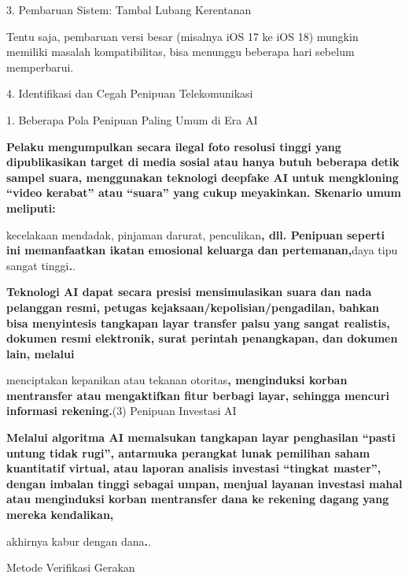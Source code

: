 3. Pembaruan Sistem: Tambal Lubang Kerentanan


Tentu saja, pembaruan versi besar (misalnya iOS 17 ke iOS 18) mungkin memiliki masalah kompatibilitas, bisa menunggu beberapa hari sebelum memperbarui.

4. Identifikasi dan Cegah Penipuan Telekomunikasi


1. Beberapa Pola Penipuan Paling Umum di Era AI


\textbf{Pelaku mengumpulkan secara ilegal foto resolusi tinggi yang dipublikasikan target di media sosial atau hanya butuh beberapa detik sampel suara, menggunakan teknologi deepfake AI untuk mengkloning “video kerabat” atau “suara” yang cukup meyakinkan. Skenario umum meliputi:}\par

kecelakaan mendadak, pinjaman darurat, penculikan\textbf{, dll. Penipuan seperti ini memanfaatkan ikatan emosional keluarga dan pertemanan,}daya tipu sangat tinggi\textbf{.}.

\textbf{Teknologi AI dapat secara presisi mensimulasikan suara dan nada pelanggan resmi, petugas kejaksaan/kepolisian/pengadilan, bahkan bisa menyintesis tangkapan layar transfer palsu yang sangat realistis, dokumen resmi elektronik, surat perintah penangkapan, dan dokumen lain, melalui}\par

menciptakan kepanikan atau tekanan otoritas\textbf{, menginduksi korban mentransfer atau mengaktifkan fitur berbagi layar, sehingga mencuri informasi rekening.}(3) Penipuan Investasi AI

\textbf{Melalui algoritma AI memalsukan tangkapan layar penghasilan “pasti untung tidak rugi”, antarmuka perangkat lunak pemilihan saham kuantitatif virtual, atau laporan analisis investasi “tingkat master”, dengan imbalan tinggi sebagai umpan, menjual layanan investasi mahal atau menginduksi korban mentransfer dana ke rekening dagang yang mereka kendalikan,}\par

akhirnya kabur dengan dana\textbf{.}.


Metode Verifikasi Gerakan

